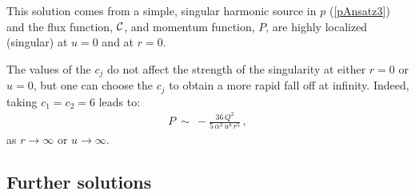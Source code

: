 \documentclass[11pt]{article}
\def\cC{{\cal C}}
\numberwithin{equation}{section}
\begin{document}
This solution comes from a simple, singular harmonic source in $p$ (\ref{pAnsatz3}) and the flux function, $\cC$, and momentum function, $P$, are highly localized (singular) at $u=0$ and at $r=0$.  

The values of the $c_j$ do not affect the strength of the singularity at either $r=0$ or $u=0$, but one can choose the $c_j$ to obtain a more rapid fall off at infinity.  Indeed, taking $c_1 =c_2 =6$ leads to:
%
\begin{equation}
\begin{aligned}
P   ~\sim~  -\frac{36\, Q^2 }{5\, \alpha^{3} \, u^8 \, r^5 }  \,,
\end{aligned}
\label{Pasymp2}
\end{equation}
%
as $r \to \infty$ or  $u \to \infty$.


\subsection{Further solutions}
\label{ss:examples}

\end{document}
